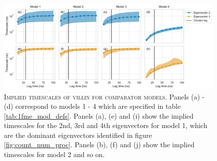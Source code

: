 \documentclass{article}
\begin{document}
\begin{figure}[h]
    \centering
    \includegraphics[width=1\textwidth]{figures/model_comparision_its/2f4k.pdf}
    \caption{\textsc{Implied timescales of villin for comparator models.} Panels (a) - (d) correspond to models 1 - 4 which are specified in table \ref{tab:1fme_mod_defs}. Panels (a), (e) and (i) show the implied timescales for the 2nd, 3rd and 4th eigenvectors for model 1, which are the dominant eigenvectors identified in figure \ref{fig:count_num_proc}.  Panels (b), (f) and (j) show the implied timescales for model 2 and so on.}
    \label{fig:2f4k_its}
\end{figure}
\end{document}

